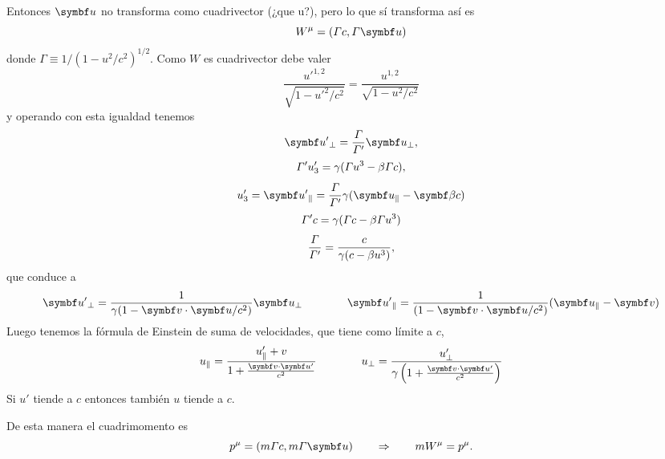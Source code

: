 \documentclass[10pt,oneside]{CBFT_book}
\begin{document}
Entonces $\vb{u}$ no transforma como cuadrivector (¿que u?), pero lo que sí transforma así es
\[
	W^\mu = ( \Gamma c , \Gamma \vb{u} ) 
\]
donde $ \Gamma \equiv 1/( 1 - u^2/c^2)^{1/2}$. Como $W$ es cuadrivector debe valer
\[
	\frac{ {u'}^{1,2} }{\sqrt{1 - {u'}^2/c^2 }} =
	\frac{ {u}^{1,2} }{\sqrt{1 - {u}^2/c^2 }}
\]
y operando con esta igualdad tenemos
\[
	\vb{u'}_\perp = \frac{\Gamma}{\Gamma'} \vb{u}_\perp,
\]
\[
	\Gamma' u'_3 = \gamma ( \Gamma u^3 - \beta \Gamma c ),
\]
\[
	u'_3 = \vb{u'}_\parallel = 
	\frac{\Gamma}{\Gamma'} \gamma (\vb{u}_\parallel - \vb{\b} c)
\]
\[
	\Gamma' c = \gamma ( \Gamma c - \beta \Gamma u^3 )
\]
\[
	\frac{\Gamma}{\Gamma'} = \frac{ c }{ \gamma ( c - \beta u^3 ) },
\]
que conduce a
\[
	\vb{u'}_\perp = \frac{ 1 }{ \gamma ( 1 - \pe{v}{u}/c^2 )} \vb{u}_\perp 
	\qquad \qquad 
	\vb{u'}_\parallel = \frac{ 1 }{( 1 - \pe{v}{u}/c^2 )}( \vb{u}_\parallel - \vb{v} )
\]
Luego tenemos la fórmula de Einstein de suma de velocidades, que tiene como límite a $c$,
\[
	u_\parallel = \frac{ u'_\parallel + v}{ 1 + \frac{\pe{v}{u'}}{c^2} } \qquad \qquad 
	u_\perp = \frac{ u'_\perp}{\gamma\left(1 + \frac{\pe{v}{u'}}{c^2}\right)}
\]
Si $u'$ tiende a $c$ entonces también $u$ tiende a $c$.

De esta manera el cuadrimomento es 
\[
	p^\mu = ( m\Gamma c, m \Gamma \vb{u}) \qquad \Rightarrow \qquad m W^\mu = p^\mu.
\]
\end{document}
